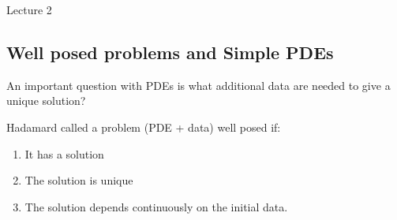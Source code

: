 \begin{center}

Lecture 2

\end{center}

\subsection{Well posed problems and Simple PDEs}

An important question with PDEs is what additional data are needed to give a unique solution?

Hadamard called a problem (PDE + data) well posed if:

\begin{enumerate}

\item It has a solution
\item The solution is unique
\item The solution depends continuously on the initial data.

\end{enumerate}


